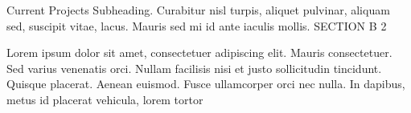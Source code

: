 \documentclass[10pt,final]{papertex}
\begin{document}
\begin{news}{2}
	{Current Projects}
	{Subheading. Curabitur nisl turpis, aliquet pulvinar, aliquam sed, suscipit vitae, lacus. Mauris sed mi id ante iaculis mollis.}
	{SECTION B}
	{2}



\noindent Lorem ipsum dolor sit amet, consectetuer adipiscing elit. Mauris consectetuer. Sed varius venenatis orci. Nullam facilisis nisi et justo sollicitudin tincidunt. Quisque placerat. Aenean euismod. Fusce ullamcorper orci nec nulla. In dapibus, metus id placerat vehicula, lorem tortor 

%
%
%


\end{news}

\newssep

%
%
\end{document}
